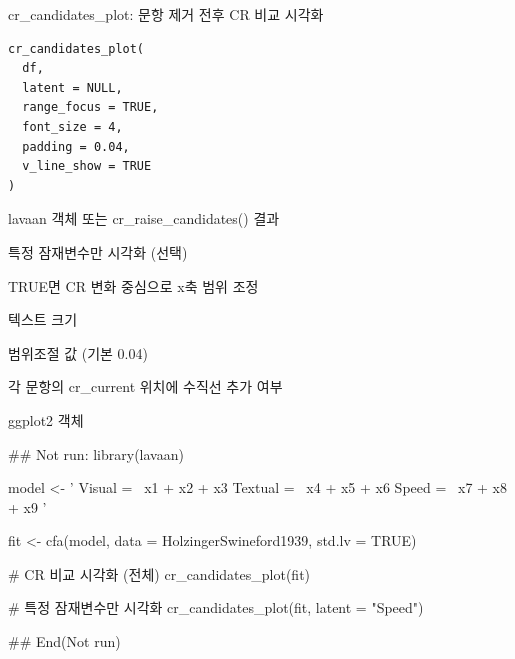 \documentclass[a4paper]{book}
\begin{document}
%
\begin{Description}
cr\_candidates\_plot: 문항 제거 전후 CR 비교 시각화
\end{Description}
%
\begin{Usage}
\begin{verbatim}
cr_candidates_plot(
  df,
  latent = NULL,
  range_focus = TRUE,
  font_size = 4,
  padding = 0.04,
  v_line_show = TRUE
)
\end{verbatim}
\end{Usage}
%
\begin{Arguments}
\begin{ldescription}
\item[\code{df}] lavaan 객체 또는 cr\_raise\_candidates() 결과

\item[\code{latent}] 특정 잠재변수만 시각화 (선택)

\item[\code{range\_focus}] TRUE면 CR 변화 중심으로 x축 범위 조정

\item[\code{font\_size}] 텍스트 크기

\item[\code{padding}] 범위조절 값 (기본 0.04)

\item[\code{v\_line\_show}] 각 문항의 cr\_current 위치에 수직선 추가 여부
\end{ldescription}
\end{Arguments}
%
\begin{Value}
ggplot2 객체
\end{Value}
%
\begin{Examples}
\begin{ExampleCode}
## Not run: 
library(lavaan)

model <- '
  Visual  =~ x1 + x2 + x3
  Textual =~ x4 + x5 + x6
  Speed   =~ x7 + x8 + x9
'

fit <- cfa(model, data = HolzingerSwineford1939, std.lv = TRUE)

# CR 비교 시각화 (전체)
cr_candidates_plot(fit)

# 특정 잠재변수만 시각화
cr_candidates_plot(fit, latent = "Speed")

## End(Not run)
\end{ExampleCode}
\end{Examples}
\end{document}
